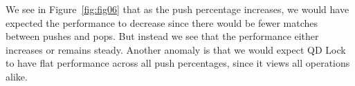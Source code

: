 We see in Figure~\ref{fig:fig06} that as the push percentage increases, we would have expected the performance to decrease since there would be fewer matches between pushes and pops. But instead we see that the performance either increases or remains steady. Another anomaly is that we would expect QD Lock to have flat performance across all push percentages, since it views all operations alike.

\begin{figure}[]
\centering
{}
\\

\end{figure}
